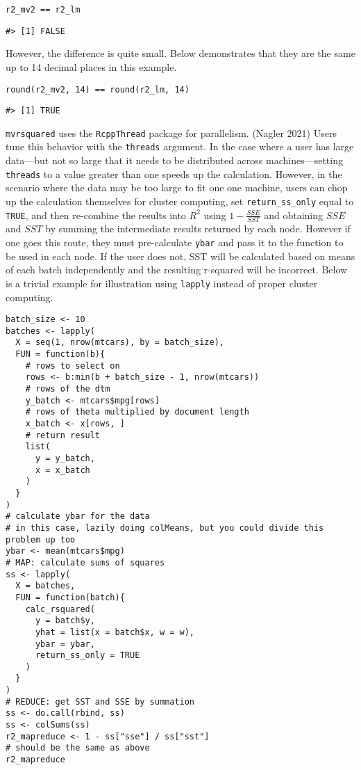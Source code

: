 \begin{verbatim}
r2_mv2 == r2_lm
\end{verbatim}

\begin{verbatim}
#> [1] FALSE
\end{verbatim}

However, the difference is quite small. Below demonstrates that they are the same up to 14 decimal places in this example.

\begin{verbatim}
round(r2_mv2, 14) == round(r2_lm, 14)
\end{verbatim}

\begin{verbatim}
#> [1] TRUE
\end{verbatim}

\texttt{mvrsquared} uses the \texttt{RcppThread} package for parallelism. (Nagler 2021) Users tune this behavior with the \texttt{threads} argument. In the case where a user has large data---but not so large that it needs to be distributed across machines---setting \texttt{threads} to a value greater than one speeds up the calculation. However, in the scenario where the data may be too large to fit one one machine, users can chop up the calculation themselves for cluster computing, set \texttt{return\_ss\_only} equal to \texttt{TRUE}, and then re-combine the results into \(R^2\) using \(1 - \frac{SSE}{SST}\) and obtaining \(SSE\) and \(SST\) by summing the intermediate results returned by each node. However if one goes this route, they must pre-calculate \texttt{ybar} and pass it to the function to be used in each node. If the user does not, SST will be calculated based on means of each batch independently and the resulting r-squared will be incorrect. Below is a trivial example for illustration using \texttt{lapply} instead of proper cluster computing.

\begin{verbatim}
batch_size <- 10
batches <- lapply(
  X = seq(1, nrow(mtcars), by = batch_size),
  FUN = function(b){
    # rows to select on
    rows <- b:min(b + batch_size - 1, nrow(mtcars))
    # rows of the dtm
    y_batch <- mtcars$mpg[rows]
    # rows of theta multiplied by document length
    x_batch <- x[rows, ]
    # return result
    list(
      y = y_batch,
      x = x_batch
    )
  }
)
# calculate ybar for the data
# in this case, lazily doing colMeans, but you could divide this problem up too
ybar <- mean(mtcars$mpg)
# MAP: calculate sums of squares
ss <- lapply(
  X = batches,
  FUN = function(batch){
    calc_rsquared(
      y = batch$y,
      yhat = list(x = batch$x, w = w),
      ybar = ybar,
      return_ss_only = TRUE
    )
  }
)
# REDUCE: get SST and SSE by summation
ss <- do.call(rbind, ss) 
ss <- colSums(ss)
r2_mapreduce <- 1 - ss["sse"] / ss["sst"]
# should be the same as above
r2_mapreduce
\end{verbatim}

